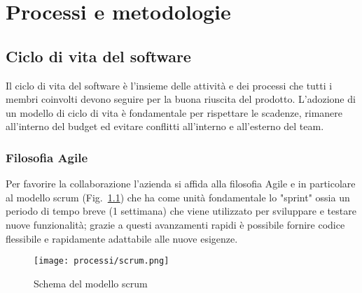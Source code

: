 \chapter{Processi e metodologie}
\label{cap:processi-metodologie}



\section{Ciclo di vita del software}
Il ciclo di vita del software è l'insieme delle attività e dei processi che tutti i membri coinvolti devono seguire per la buona riuscita del prodotto.
L'adozione di un modello di ciclo di vita è fondamentale per rispettare le scadenze, rimanere all'interno del budget ed evitare conflitti all'interno e all'esterno del team.

\subsection{Filosofia Agile}
Per favorire la collaborazione l'azienda si affida alla filosofia Agile e in particolare al modello scrum (Fig.~\ref{fig:schema-scrum}) che ha come unità fondamentale lo "sprint" ossia un periodo di tempo breve (1 settimana) che viene utilizzato per sviluppare e testare nuove funzionalità; grazie a questi avanzamenti rapidi è possibile fornire codice flessibile e rapidamente adattabile alle nuove esigenze. 

\begin{figure}[!h] 
    \centering 
    \texttt{[image: processi/scrum.png]} 
    \caption{Schema del modello scrum}
    \label{fig:schema-scrum}
  \end{figure}
  
